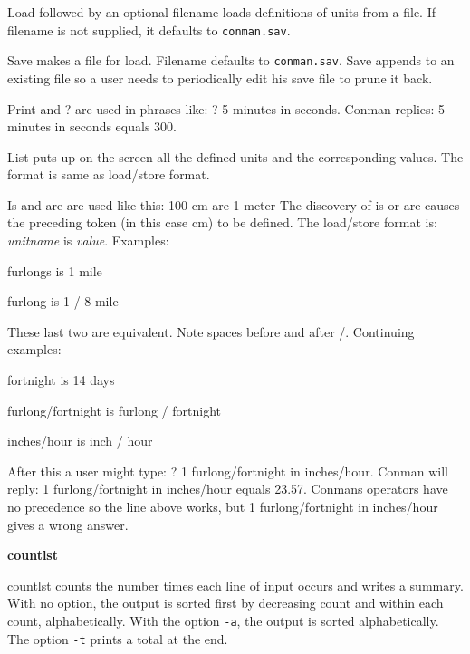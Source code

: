 {{\textquotedbl}Load{\textquotedbl} followed by an optional filename
loads definitions of units from a file. If filename is not supplied, it
defaults to \texttt{conman.sav}.

{\textquotedbl}Save{\textquotedbl} makes a file for
{\textquotedbl}load{\textquotedbl}. Filename defaults to
\texttt{conman.sav}. {\textquotedbl}Save{\textquotedbl} appends to an
existing file so a user needs to periodically edit his save file to
prune it back.

{\textquotedbl}Print{\textquotedbl} and {\textquotedbl}?{\textquotedbl}
are used in phrases like: ? 5 minutes in seconds. Conman replies: 5
minutes in seconds equals 300.

List puts up on the screen all the defined units and the corresponding
values. The format is same as load/store format.

{\textquotedbl}Is{\textquotedbl} and {\textquotedbl}are{\textquotedbl}
are used like this: 100 cm are 1 meter The discovery of is or are
causes the preceding token (in this case
{\textquotedbl}cm{\textquotedbl}) to be defined. The load/store format
is: \textit{unitname} {\textquotedbl}is{\textquotedbl} \textit{value}.
Examples:

{ furlongs is 1 mile}

{\sffamily
furlong is 1 / 8 mile }

These last two are equivalent. Note spaces before and after
{\textquotedbl}/{\textquotedbl}. Continuing examples:

{ fortnight is 14 days }

{\sffamily
furlong/fortnight is furlong / fortnight}

{\sffamily
inches/hour is inch / hour }

After this a user might type: ? 1 furlong/fortnight in inches/hour.
Conman will reply: 1 furlong/fortnight in inches/hour equals 23.57.
Conman{\textquotesingle}s operators have no precedence so the line
above works, but 1 furlong/fortnight in inches/hour gives a wrong
answer. 

{\sffamily\bfseries
countlst\ \ \ \ \ \ \ \ \ \ \ \ \ \ \ \ \ \ \ \ }

\textsf{countlst} counts the number times each line of input occurs and
writes a summary. With no option, the output is sorted first by
decreasing count and within each count, alphabetically. With the option
\texttt{{}-a}, the output is sorted alphabetically. The option
\texttt{{}-t} prints a total at the end.

}
